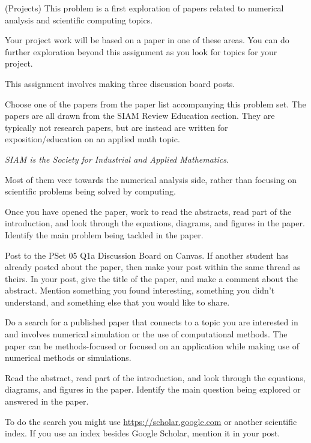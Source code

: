 \documentclass[12pt,letterpaper,noanswers]{exam}
\begin{document}
\begin{questions}
\question (Projects) This problem is a first exploration of papers related to numerical analysis and scientific computing topics.

Your project work will be based on a paper in one of these areas.  You can do further exploration beyond this assignment as you look for topics for your project.

This assignment involves making three discussion board posts.


\begin{parts}
\item Choose one of the papers from the paper list accompanying this problem set.  The papers are all drawn from the SIAM Review Education section.  They are typically not research papers, but are instead are written for exposition/education on an applied math topic.


\emph{SIAM is the Society for Industrial and Applied Mathematics}.

Most of them veer towards the numerical analysis side, rather than focusing on scientific problems being solved by computing.
    
Once you have opened the paper, work to read the abstracts, read part of the introduction, and look through the equations, diagrams, and figures in the paper.  Identify the main problem being tackled in the paper.


Post to the PSet 05 Q1a Discussion Board on Canvas.  If another student has already posted about the paper, then make your post within the same thread as theirs.  In your post, give the title of the paper, and make a comment about the abstract.  Mention something you found interesting, something you didn't understand, and something else that you would like to share.


\item Do a search for a published paper that connects to a topic you are interested in and involves numerical simulation or the use of computational methods.  The paper can be methods-focused or focused on an application while making use of numerical methods or simulations.

Read the abstract, read part of the introduction, and look through the equations, diagrams, and figures in the paper.  Identify the main question being explored or answered in the paper.

To do the search you might use \url{https://scholar.google.com} or another scientific index.  If you use an index besides Google Scholar, mention it in your post.    
    


\end{parts}
\end{questions}
\end{document}
